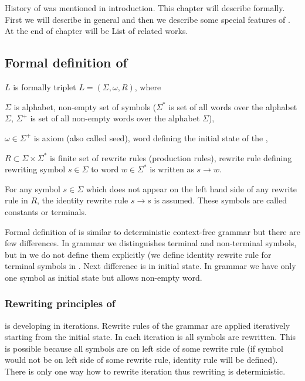 
\chapter{\lsystem}

History of \lsystem was mentioned in introduction.
This chapter will describe \lsystem formally.
First we will describe \lsystem in general and then we describe some special features of \lsystem.
At the end of chapter will be List of related works.


\section{Formal definition of \lsystem}

\lsystem $L$ is formally triplet $L = (\Sigma, \omega, R)$, where

\begin{itemize*}
	\item $\Sigma$ is alphabet, non-empty set of symbols ($\Sigma^{*}$ is set of all words over the alphabet $\Sigma$, $\Sigma^{+}$ is set of all non-empty words over the alphabet $\Sigma$),
	\item $\omega \in \Sigma^{+}$ is axiom (also called seed), word defining the initial state of the \lsystem,
	\item $R \subset \Sigma \times \Sigma^{*}$ is finite set of rewrite rules (production rules), rewrite rule defining rewriting symbol $s \in \Sigma$ to word $w \in \Sigma^{*}$ is written as $s \rightarrow w$.
\end{itemize*}

For any symbol $s \in \Sigma$ which does not appear on the left hand side of any rewrite rule in $R$, the identity rewrite rule $s \rightarrow s$ is assumed.
These symbols are called constants or terminals.

Formal definition of \lsystem is similar to deterministic context-free grammar but there are few differences.
In grammar we distinguishes terminal and non-terminal symbols, but in \lsystems we do not define them explicitly (we define identity rewrite rule for terminal symbols in \lsystems.
Next difference is in initial state.
In grammar we have only one symbol as initial state but \lsystem allows non-empty word.


\subsection{Rewriting principles of \lsystem}

\lsystem is developing in iterations.
Rewrite rules of the \lsystem grammar are applied iteratively starting from the initial state.
In each iteration is all symbols are rewritten.
This is possible because all symbols are on left side of some rewrite rule (if symbol would not be on left side of some rewrite rule, identity rule will be defined).
There is only one way how to rewrite iteration thus rewriting is deterministic.



